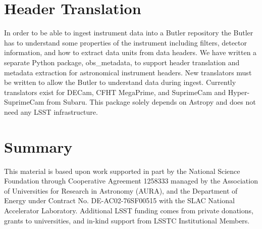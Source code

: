 \documentclass[11pt,twoside]{article}
\begin{document}
\section{Header Translation}

In order to be able to ingest instrument data into a Butler repository the Butler has to understand some properties of the instrument including filters, detector information, and how to extract data units from data headers.
We have written a separate Python package, obs\_metadata, to support header translation and metadata extraction for astronomical instrument headers.
New translators must be written to allow the Butler to understand data during ingest.
Currently translators exist for DECam, CFHT MegaPrime, and SuprimeCam and Hyper-SuprimeCam from Subaru.
This package solely depends on Astropy and does not need any LSST infrastructure.

\section{Summary}

\acknowledgements This material is based upon work supported in part by the National Science Foundation through Cooperative Agreement 1258333 managed by the Association of Universities for Research in Astronomy (AURA), and the Department of Energy under Contract No. DE-AC02-76SF00515 with the SLAC National Accelerator Laboratory.
Additional LSST funding comes from private donations, grants to universities, and in-kind support from LSSTC Institutional Members.

\end{document}

